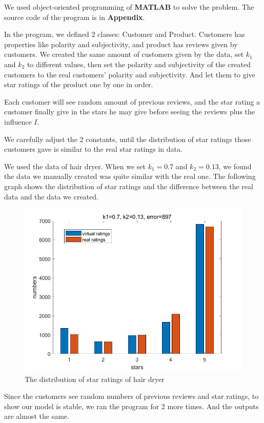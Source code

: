 \documentclass[12pt]{article}  %
\begin{document}
We used object-oriented programming of \textbf{MATLAB} to solve the problem. The source code of the program is in \textbf{Appendix}.

In the program, we defined 2 classes: Customer and Product. Customers has properties like polarity and subjectivity, and product has reviews given by customers. We created the same amount of customers given by the data, set $k_1$ and $k_2$ to different values, then set the polarity and subjectivity of the created customers to the real customers' polarity and subjectivity. And let them to give star ratings of the product one by one in order.

Each customer will see random amount of previous reviews, and the star rating a customer finally give in the stars he may give before seeing the reviews plus the influence $I$.

We carefully adjust the 2 constants, until the distribution of star ratings those customers gave is similar to the real star ratings in data.

We used the data of hair dryer. When we set $k_1=0.7$ and $k_2=0.13$, we found the data we manually created was quite similar with the real one. The following graph shows the distribution of star ratings and the difference between the real data and the data we created.

\begin{figure}[H]
  \centering
  \includegraphics[width=0.7\linewidth]{Q4picture/0.jpg}
  \caption{The distribution of star ratings of hair dryer}
  \label{fig:}
\end{figure}

Since the customers see random numbers of previous reviews and star ratings, to show our model is stable, we ran the program for 2 more times. And the outputs are almost the same.
\end{document}
